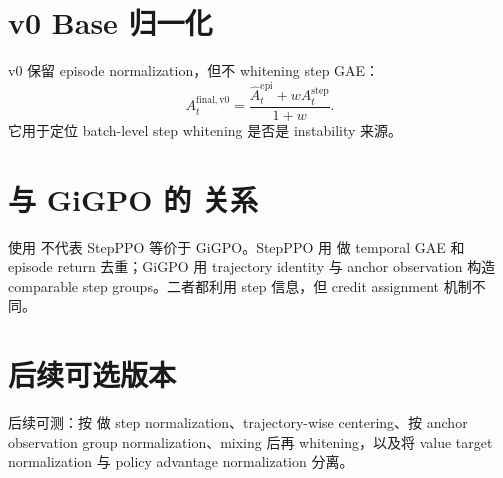 \documentclass[10pt]{ctexart}
\begin{document}
\section*{v0 Base 归一化}
v0 保留 episode normalization，但不 whitening step GAE：
\[
A_t^{\mathrm{final,v0}}=\frac{\widehat A_t^{\mathrm{epi}}+w A_t^{\mathrm{step}}}{1+w}.
\]
它用于定位 batch-level step whitening 是否是 instability 来源。

\section*{与 GiGPO 的  关系}
使用  不代表 StepPPO 等价于 GiGPO。StepPPO 用  做 temporal GAE 和 episode return 去重；GiGPO 用 trajectory identity 与 anchor observation 构造 comparable step groups。二者都利用 step 信息，但 credit assignment 机制不同。

\section*{后续可选版本}
后续可测：按  做 step normalization、trajectory-wise centering、按 anchor observation group normalization、mixing 后再 whitening，以及将 value target normalization 与 policy advantage normalization 分离。
\end{document}
